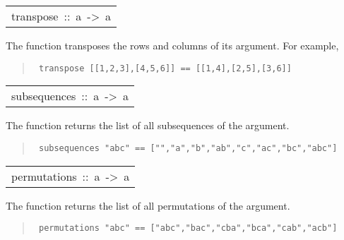 \begin{haddockdesc}
\item[\begin{tabular}{@{}l}
transpose\ ::\ {\char 91}{\char 91}a{\char 93}{\char 93}\ ->\ {\char 91}{\char 91}a{\char 93}{\char 93}
\end{tabular}]\haddockbegindoc
The  function transposes the rows and columns of its argument.
 For example,
\par
\begin{quote}
{\haddockverb\begin{verbatim}
 transpose [[1,2,3],[4,5,6]] == [[1,4],[2,5],[3,6]]
\end{verbatim}}
\end{quote}

\end{haddockdesc}
\begin{haddockdesc}
\item[\begin{tabular}{@{}l}
subsequences\ ::\ {\char 91}a{\char 93}\ ->\ {\char 91}{\char 91}a{\char 93}{\char 93}
\end{tabular}]\haddockbegindoc
The  function returns the list of all subsequences of the argument.
\par
\begin{quote}
{\haddockverb\begin{verbatim}
 subsequences "abc" == ["","a","b","ab","c","ac","bc","abc"]
\end{verbatim}}
\end{quote}

\end{haddockdesc}
\begin{haddockdesc}
\item[\begin{tabular}{@{}l}
permutations\ ::\ {\char 91}a{\char 93}\ ->\ {\char 91}{\char 91}a{\char 93}{\char 93}
\end{tabular}]\haddockbegindoc
The  function returns the list of all permutations of the argument.
\par
\begin{quote}
{\haddockverb\begin{verbatim}
 permutations "abc" == ["abc","bac","cba","bca","cab","acb"]
\end{verbatim}}
\end{quote}

\end{haddockdesc}
